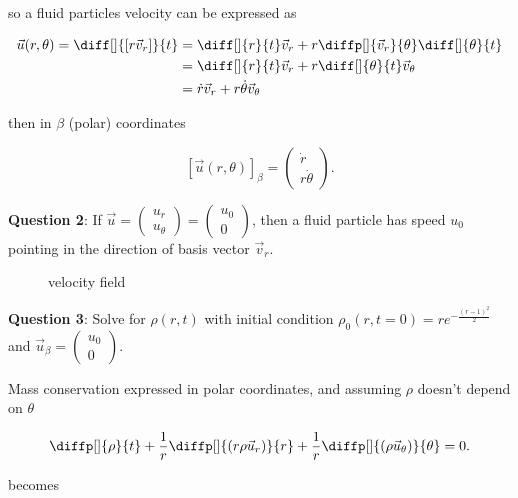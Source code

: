  so a fluid particles velocity can be expressed as

 \begin{align*}
   \vec{u}(r, \theta) = \diff[]{[r\vec{v}_r]}{t} &= \diff[]{r}{t}\vec{v}_r+r
   \diffp[]{\vec{v}_r}{ \theta} \diff[]{ \theta}{t}\\
                                                 &= \diff[]{r}{t}\vec{v}_r+r
                                                 \diff[]{ \theta}{t}\vec{v}_{
                                                 \theta} \\
                                                 &= \dot{r} \vec{v}_{r}
                                                 + r \dot{\theta} \vec{v}_{\theta}
 \end{align*}

 then in $ \beta$ (polar) coordinates

 \[
   [\vec{u}(r, \theta)]_{\beta} = \begin{pmatrix}
     \dot{r} \\ r \dot{ \theta} 
   \end{pmatrix}
 .\] 

 \textbf{Question 2}: If $\vec{u} = \begin{pmatrix} u_{r} \\ u_{ \theta}
 \end{pmatrix} = \begin{pmatrix} u_0 \\ 0 \end{pmatrix}$, then a fluid particle
 has speed $u_0$ pointing in the direction of basis vector $\vec{v}_{r}$.

\begin{figure}[H]
    \centering
    \caption{velocity field}
    \label{fig:velocityfield}
\end{figure}

\textbf{Question 3}: Solve for $ \rho(r,t)$ with initial condition
$ \rho_0(r,t=0) = r e^{-\frac{(r-1)^{2}}{2}}$ and  $\vec{u}_{\beta}
= \begin{pmatrix} u_0 \\ 0 \end{pmatrix}$.

Mass conservation expressed in polar coordinates, and assuming $ \rho$ doesn't
depend on $ \theta$

\[
  \diffp[]{ \rho}{t} + \frac{1}{r} \diffp[]{(r\rho \vec{u}_r)}{r} + \frac{1}{r}
  \diffp[]{( \rho \vec{u}_\theta)}{\theta}= 0
.\] 

becomes

